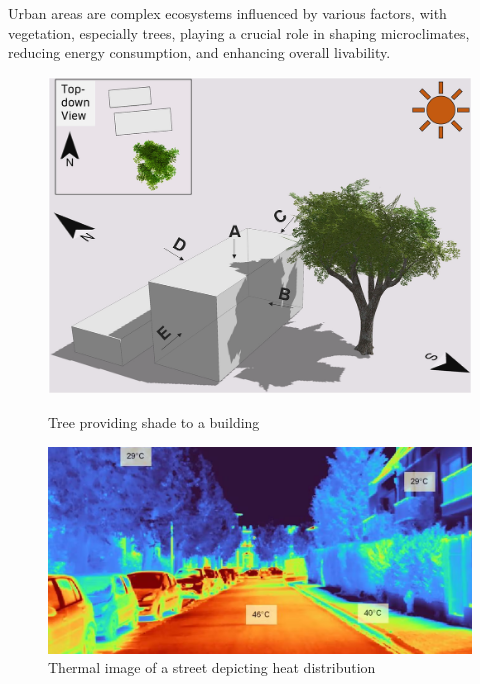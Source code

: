 \documentclass[12pt]{article}
\begin{document}
Urban areas are complex ecosystems influenced by various factors, with
vegetation, especially trees, playing a crucial role in shaping microclimates,
reducing energy consumption, and enhancing overall livability\cite{TIR4sTREEt}.

\begin{figure}[H]
    \begin{minipage}{0.45\textwidth}
        \centering
        \includegraphics[width=1\textwidth]{images/tree-shade.png}
        \caption{Tree providing shade to a building \cite{img:TreeShade}}
    \end{minipage}
    \begin{minipage}{0.45\textwidth}
        \centering
        \includegraphics[width=1\textwidth]{images/heat-street.png}
        \caption{Thermal image of a street depicting heat distribution \cite{img:street_thermography}}
    \end{minipage}
\end{figure}
\end{document}

